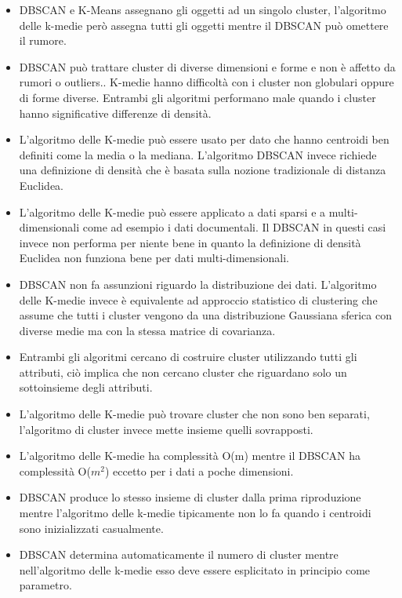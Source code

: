 \begin{itemize}
	\item DBSCAN e K-Means assegnano gli oggetti ad un singolo cluster, l'algoritmo delle k-medie però assegna tutti gli oggetti mentre il DBSCAN può omettere il rumore.
	\item DBSCAN può trattare cluster di diverse dimensioni e forme e non è affetto da rumori o outliers.. K-medie hanno difficoltà con i cluster non globulari oppure di forme diverse. Entrambi gli algoritmi performano male quando i cluster hanno significative differenze di densità.
	\item L'algoritmo delle K-medie può essere usato per dato che hanno centroidi ben definiti come la media o la mediana. L'algoritmo DBSCAN invece richiede una definizione di densità che è basata sulla nozione tradizionale di distanza Euclidea.
	\item L'algoritmo delle K-medie può essere applicato a dati sparsi e a multi-dimensionali come ad esempio i dati documentali. Il DBSCAN in questi casi invece non performa per niente bene in quanto la definizione di densità Euclidea non funziona bene per dati multi-dimensionali.
	\item DBSCAN non fa assunzioni riguardo la distribuzione dei dati. L'algoritmo delle K-medie invece è equivalente ad approccio statistico di clustering che assume che tutti i cluster vengono da una distribuzione Gaussiana sferica con diverse medie ma con la stessa matrice di covarianza.
	\item Entrambi gli algoritmi cercano di costruire cluster utilizzando tutti gli attributi, ciò implica che non cercano cluster che riguardano solo un sottoinsieme degli attributi.
	\item L'algoritmo delle K-medie può trovare cluster che non sono ben separati, l'algoritmo di cluster invece mette insieme quelli sovrapposti.
	
	\item L'algoritmo delle K-medie ha complessità O(m) mentre il DBSCAN ha complessità O($m^{2}$) eccetto per i dati a poche dimensioni.
	\item DBSCAN produce lo stesso insieme di cluster dalla prima riproduzione mentre l'algoritmo delle k-medie tipicamente non lo fa quando i centroidi sono inizializzati casualmente. 
	\item DBSCAN determina automaticamente il numero di cluster mentre nell'algoritmo delle k-medie esso deve essere esplicitato in principio come parametro.
\end{itemize}

